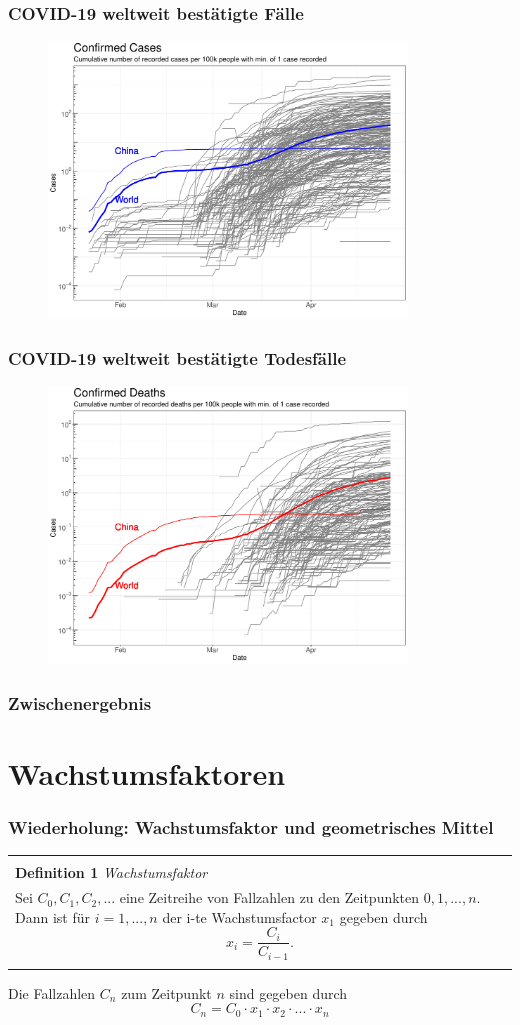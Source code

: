 \documentclass{beamer}
\newenvironment{boxeded}
    {\begin{center}
    \begin{tabular}{|p{0.9\textwidth}|}
    \hline\\
    }
    { 
    \\\\\hline
    \end{tabular} 
    \end{center}
    }
\begin{document}
 \begin{frame}
 	\frametitle{COVID-19 weltweit bestätigte Fälle}
	\begin{figure}
		\centering
		\includegraphics[width = 270pt]{Cases_cumulative_confirmed.pdf}
	\end{figure}
 \end{frame}

 \begin{frame}
 	\frametitle{COVID-19 weltweit bestätigte Todesfälle}
	\begin{figure}
		\centering
		\includegraphics[width = 270pt]{Cases_cumulative_deaths.pdf}
	\end{figure}
 \end{frame}

 \begin{frame}
 	\frametitle{Zwischenergebnis}
 \end{frame}

\section{Wachstumsfaktoren}
\begin{frame}
	\frametitle{Wiederholung: Wachstumsfaktor und geometrisches Mittel}
	\begin{boxeded}
		\textbf{Definition 1} \textit{Wachstumsfaktor}\\
		Sei $C_0, C_1, C_2, ...$ eine Zeitreihe von Fallzahlen zu den Zeitpunkten $0, 1, ..., n$. Dann ist für $i = 1, ..., n$ der i-te Wachstumsfactor $x_1$ gegeben durch $$ x_i = \frac{C_i}{C_{i-1}}.$$
	\end{boxeded}

	Die Fallzahlen $C_n$ zum Zeitpunkt $n$ sind gegeben durch $$C_n = C_0 \cdot x_1 \cdot x_2 \cdot ... \cdot x_n$$
\end{frame}
\end{document}
